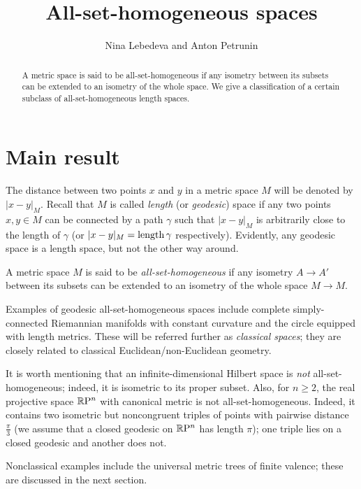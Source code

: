 \documentclass[a4paper,10pt]{article}
\def\thetitle{All-set-homogeneous spaces}
\def\theauthors{Nina Lebedeva and Anton Petrunin}
\begin{document}


\title{\thetitle}
\author{\theauthors}
\date{}
\maketitle

\begin{abstract}
A metric space is said to be all-set-homogeneous if any isometry between its subsets can be extended to an isometry of the whole space.
We give a classification of a certain subclass of all-set-homogeneous length spaces.
\end{abstract}

\section{Main result}

The distance between two points $x$ and $y$ in a metric space $M$ will be denoted by $|x-y|_M$.
Recall that $M$ is called \emph{length} (or \emph{geodesic}) space if any two points $x,y\in M$ can be connected by a path $\gamma$ 
such that $|x-y|_M$ is arbitrarily close to the length of $\gamma$ (or $|x-y|_M=\mathop{\rm length}\nolimits\gamma$ respectively).
Evidently, any geodesic space is a length space, but not the other way around.

A metric space $M$ is said to be \emph{all-set-homogeneous} 
if any isometry $A\to A'$ between its subsets can be extended to an isometry of the whole space $M\to M$.

Examples of geodesic all-set-homogeneous spaces include complete simply-connected Riemannian manifolds with constant curvature and the circle equipped with length metrics.
These will be referred further as \emph{classical spaces};
they are closely related to classical Euclidean/non-Euclidean geometry.

It is worth mentioning that an infinite-dimensional Hilbert space is \emph{not} all-set-homogeneous;
indeed, it is isometric to its proper subset.
Also, for $n\ge2$, the real projective space $\mathbb{R}\mathrm{P}^n$ with canonical metric is not all-set-homogeneous.
Indeed, it contains two isometric but noncongruent triples of points with pairwise distance $\tfrac\pi3$
(we assume that a closed geodesic on $\mathbb{R}\mathrm{P}^n$ has length $\pi$);
one triple lies on a closed geodesic and another does not. 

Nonclassical examples include the universal metric trees of finite valence;
these are discussed in the next section.
\end{document}
